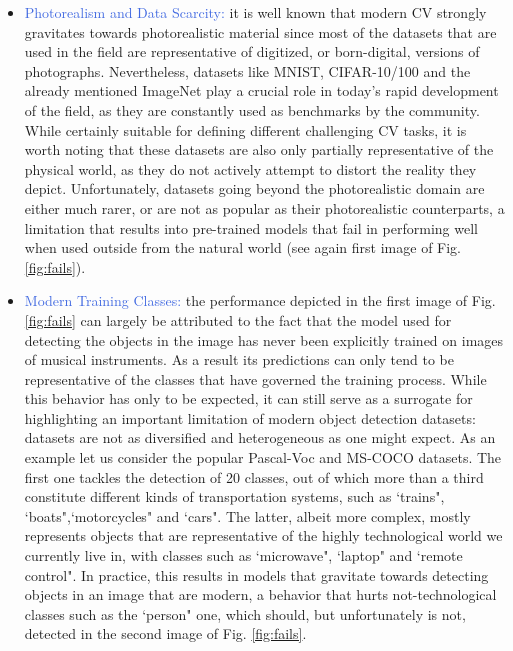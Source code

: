 \begin{itemize}
	\item \textcolor{RoyalBlue}{Photorealism and Data Scarcity:} it is well known that modern CV strongly gravitates towards photorealistic material since most of the datasets that are used in the field are representative of digitized, or born-digital, versions of photographs. Nevertheless, datasets like MNIST, CIFAR-10/100 and the already mentioned ImageNet play a crucial role in today's rapid development of the field, as they are constantly used as benchmarks by the community. While certainly suitable for defining different challenging CV tasks, it is worth noting that these datasets are also only partially representative of the physical world, as they do not actively attempt to distort the reality they depict. Unfortunately, datasets going beyond the photorealistic domain are either much rarer, or are not as popular as their photorealistic counterparts, a limitation that results into pre-trained models that fail in performing well when used outside from the natural world (see again first image of Fig. \ref{fig:fails}).  

	\item \textcolor{RoyalBlue}{Modern Training Classes:} the performance depicted in the first image of Fig. \ref{fig:fails} can largely be attributed to the fact that the model used for detecting the objects in the image has never been explicitly trained on images of musical instruments. As a result its predictions can only tend to be representative of the classes that have governed the training process. While this behavior has only to be expected, it can still serve as a surrogate for highlighting an important limitation of modern object detection datasets: datasets are not as diversified and heterogeneous as one might expect. As an example let us consider the popular Pascal-Voc \cite{everingham2010pascal} and MS-COCO \cite{lin2014microsoft} datasets. The first one tackles the detection of 20 classes, out of which more than a third constitute different kinds of transportation systems, such as `trains", `boats",`motorcycles" and `cars". The latter, albeit more complex, mostly represents objects that are representative of the highly technological world we currently live in, with classes such as `microwave", `laptop" and `remote control". In practice, this results in models that gravitate towards detecting objects in an image that are modern, a behavior that hurts not-technological classes such as the `person" one, which should, but unfortunately is not, detected in the second image of Fig. \ref{fig:fails}.     


\end{itemize}
